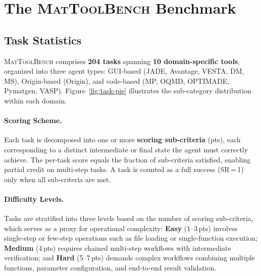 \documentclass{article}
\begin{document}
\section{The \textsc{MatToolBench} Benchmark}

\subsection{Task Statistics}

\textsc{MatToolBench} comprises \textbf{204 tasks} spanning \textbf{10 domain-specific
tools}, organized into three agent types: GUI-based (JADE, Avantage, VESTA, DM, MS),
Origin-based (Origin), and code-based (MP, OQMD, OPTIMADE, Pymatgen, VASP).
Figure~\ref{fig:task-pie} illustrates the sub-category distribution within each domain.

\paragraph{Scoring Scheme.}
Each task is decomposed into one or more \textbf{scoring sub-criteria} (pts),
each corresponding to a distinct intermediate or final state the agent must
correctly achieve. The per-task score equals the fraction of sub-criteria satisfied,
enabling partial credit on multi-step tasks. A task is counted as a full success
(SR\,=\,1) only when all sub-criteria are met.

\paragraph{Difficulty Levels.}
Tasks are stratified into three levels based on the number of scoring sub-criteria,
which serves as a proxy for operational complexity:
\textbf{Easy} (1--3\,pts) involves single-step or few-step operations such as
file loading or single-function execution;
\textbf{Medium} (4\,pts) requires chained multi-step workflows with intermediate
verification; and
\textbf{Hard} (5--7\,pts) demands complex workflows combining multiple functions,
parameter configuration, and end-to-end result validation.
\end{document}
